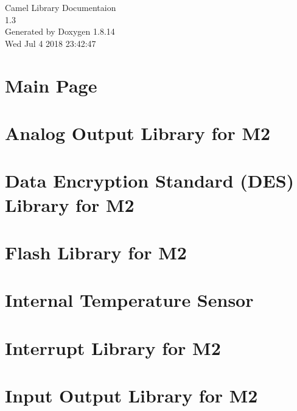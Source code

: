 \documentclass[twoside]{article}
\newcommand{\+}{\discretionary{\mbox{\scriptsize$\hookleftarrow$}}{}{}}
\begin{document}
\hypersetup{pageanchor=false,
             bookmarksnumbered=true,
             pdfencoding=unicode
            }
\begin{titlepage}
\vspace*{7cm}
\begin{center}%
{\Large Camel Library Documentaion \\[1ex]\large 1.\+3 }\\
\vspace*{1cm}
{\large Generated by Doxygen 1.8.14}\\
\vspace*{0.5cm}
{\small Wed Jul 4 2018 23:42:47}\\
\end{center}
\end{titlepage}
\tableofcontents
{}
\hypersetup{pageanchor=true}

\section{Main Page}
\label{index}\hypertarget{index}{}
\section{Analog Output Library for M2}
\label{a00139}

\section{Data Encryption Standard (D\+ES) Library for M2}
\label{a00140}

\section{Flash Library for M2}
\label{a00141}

\section{Internal Temperature Sensor}
\label{a00142}

\section{Interrupt Library for M2}
\label{a00143}

\section{Input Output Library for M2}
\label{a00144}

\end{document}
